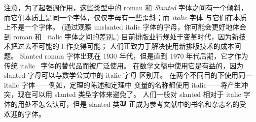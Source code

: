 注意，为了起强调作用，这些类型中的 roman 和 {\sl Slanted} 字体之间有一个倾斜，
而它们本质上是同一个字体，仅仅字母有一些歪斜；而 {\it italic} 字体%
与它们在本质上不是一个字体。%
(通过观察 {\tenu unslanted italic} 字体的字母，你可能会更好地体会到 roman 和%
~italic 字体之间的差别。)
目前排版业行规处于变革时代，因为新技术把过去不可能的工作变得可能；
人们正致力于解决使用新排版技术的成本问题。%
Slanted roman 字体出现在 1930 年代，但是直到 1970 年代后期，它才作为传统 italic~%
字体的替代品而被广泛使用。%
在数学文稿中使用它是有益的，因为 slanted 字母可以与数学公式中的 italic 字母%
区别开。%
在两个不同目的下使用同一 italic 字体——例如，定理的陈述和定理中%
变量的名称都使用 italic——将产生冲突，现在可以用 slanted 类型字体来避免了。%
人们一般对 slanted 相对于 italic 字体的用处不怎么认可，但是 slanted 类型%
正成为参考文献中的书名和杂志名的受欢迎的字体。

